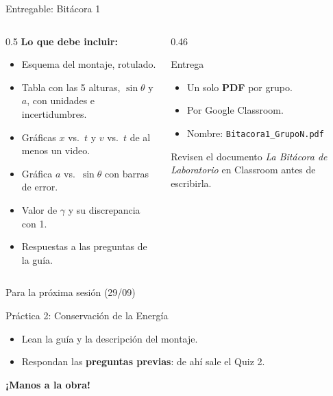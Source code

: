 \documentclass[aspectratio=169,xcolor=dvipsnames]{beamer}
\begin{document}
	\begin{frame}{Entregable: Bitácora 1}
		\begin{columns}[T]
			\begin{column}{0.5\textwidth}
				\textbf{Lo que debe incluir:}
				\begin{itemize}
					\small
					\item Esquema del montaje, rotulado.
					\item Tabla con las 5 alturas, $\sin\theta$ y $a$, con unidades e
					incertidumbres.
					\item Gráficas $x$ vs.\ $t$ y $v$ vs.\ $t$ de al menos un video.
					\item Gráfica $a$ vs.\ $\sin\theta$ con barras de error.
					\item Valor de $\gamma$ y su discrepancia con 1.
					\item Respuestas a las preguntas de la guía.
				\end{itemize}
			\end{column}
			\begin{column}{0.46\textwidth}
				\begin{block}{Entrega}
					\small
					\begin{itemize}
						\item Un solo \textbf{PDF} por grupo.
						\item Por Google Classroom.
						\item Nombre: \texttt{Bitacora1\_GrupoN.pdf}
					\end{itemize}
				\end{block}
				
				\vspace{0.3cm}
				\small
				Revisen el documento \emph{La Bitácora de Laboratorio} en
				Classroom antes de escribirla.
			\end{column}
		\end{columns}
	\end{frame}
	
	\begin{frame}{Para la próxima sesión (29/09)}
		\begin{block}{Práctica 2: Conservación de la Energía}
			\begin{itemize}
				\item Lean la guía y la descripción del montaje.
				\item Respondan las \textbf{preguntas previas}: de ahí sale el Quiz 2.
			\end{itemize}
		\end{block}
		
		\vspace{0.5cm}
		\begin{center}
			\Large \textcolor{UnalGreen}{\textbf{¡Manos a la obra!}}
		\end{center}
	\end{frame}
	
\end{document}
